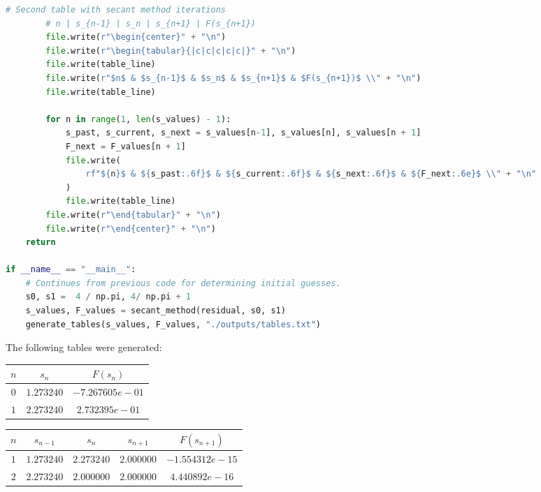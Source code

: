 \documentclass[12pt]{article}
\begin{document}
\begin{lstlisting}[language=Python, caption={Full Shooting Method Implementation (hw3.py)}]
        # Second table with secant method iterations
        # n | s_{n-1} | s_n | s_{n+1} | F(s_{n+1})
        file.write(r"\begin{center}" + "\n")
        file.write(r"\begin{tabular}{|c|c|c|c|c|}" + "\n")
        file.write(table_line)
        file.write(r"$n$ & $s_{n-1}$ & $s_n$ & $s_{n+1}$ & $F(s_{n+1})$ \\" + "\n")
        file.write(table_line)
        
        for n in range(1, len(s_values) - 1): 
            s_past, s_current, s_next = s_values[n-1], s_values[n], s_values[n + 1]
            F_next = F_values[n + 1]
            file.write(
                rf"${n}$ & ${s_past:.6f}$ & ${s_current:.6f}$ & ${s_next:.6f}$ & ${F_next:.6e}$ \\" + "\n"
            )
            file.write(table_line)
        file.write(r"\end{tabular}" + "\n")
        file.write(r"\end{center}" + "\n")
    return

if __name__ == "__main__":
    # Continues from previous code for determining initial guesses.
    s0, s1 =  4 / np.pi, 4/ np.pi + 1
    s_values, F_values = secant_method(residual, s0, s1)
    generate_tables(s_values, F_values, "./outputs/tables.txt")

\end{lstlisting}

The following tables were generated:

\begin{center}
    \begin{tabular}{|c|c|c|}
    \hline
    $n$ & $s_n$ & $F(s_n)$ \\
    \hline
    $0$ & $1.273240$ & $-7.267605e-01$ \\
    \hline
    $1$ & $2.273240$ & $2.732395e-01$ \\
    \hline
    \end{tabular}
\end{center}

\begin{center}
    \begin{tabular}{|c|c|c|c|c|}
    \hline
    $n$ & $s_{n-1}$ & $s_n$ & $s_{n+1}$ & $F(s_{n+1})$ \\
    \hline
    $1$ & $1.273240$ & $2.273240$ & $2.000000$ & $-1.554312e-15$ \\
    \hline
    $2$ & $2.273240$ & $2.000000$ & $2.000000$ & $4.440892e-16$ \\
    \hline
    \end{tabular}
\end{center}
\end{document}

